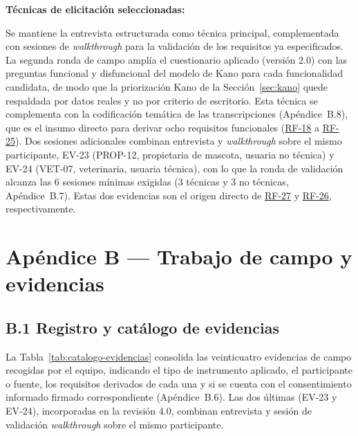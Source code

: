 \documentclass[journal,onecolumn]{IEEEtran}
\begin{document}
	\textbf{Técnicas de elicitación seleccionadas:}
	
	Se mantiene la entrevista estructurada como técnica
	principal, complementada con sesiones de \emph{walkthrough} para la
	validación de los requisitos ya especificados. La segunda ronda de campo
	amplía el cuestionario aplicado (versión 2.0) con las preguntas
	funcional y disfuncional del modelo de Kano para cada funcionalidad candidata,
	de modo que la priorización Kano de la Sección~\ref{sec:kano} quede
	respaldada por datos reales y no por criterio de escritorio. Esta técnica se
	complementa con la codificación temática de las transcripciones
	(Apéndice~B.8), que es el insumo directo para derivar ocho requisitos
	funcionales (\hyperref[tab:RF-18]{RF-18} a \hyperref[tab:RF-25]{RF-25}). Dos sesiones adicionales combinan entrevista
	y \emph{walkthrough} sobre el mismo participante,
	EV-23 (PROP-12, propietaria de mascota, usuaria no técnica) y EV-24
	(VET-07, veterinaria, usuaria técnica), con lo que la ronda de validación
	alcanza las 6 sesiones mínimas exigidas (3 técnicas y 3 no técnicas,
	Apéndice~B.7). Estas dos evidencias son el origen directo de \hyperref[tab:RF-27]{RF-27} y
	\hyperref[tab:RF-26]{RF-26}, respectivamente.
	
	\section*{Apéndice B --- Trabajo de campo y evidencias}
	\label{ap:evidencias}
	
	\subsection*{B.1 Registro y catálogo de evidencias}
	
	La Tabla~\ref{tab:catalogo-evidencias} consolida las veinticuatro evidencias
	de campo recogidas por el equipo, indicando el tipo de instrumento
	aplicado, el participante o fuente, los requisitos derivados de cada una y
	si se cuenta con el consentimiento informado firmado correspondiente
	(Apéndice~B.6). Las dos últimas (EV-23 y EV-24), incorporadas en la
	revisión 4.0, combinan entrevista y sesión de validación
	\emph{walkthrough} sobre el mismo participante.
	
\end{document}
